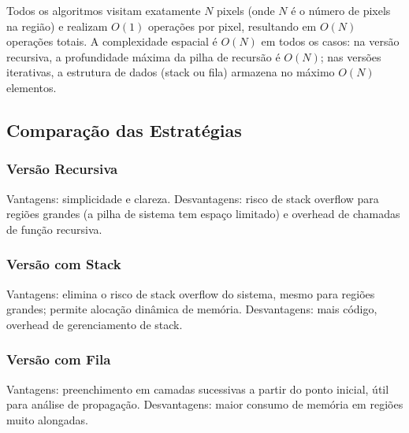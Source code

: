 \documentclass[12pt,a4paper]{article}
\begin{document}
Todos os algoritmos visitam exatamente $N$ pixels (onde $N$ é o número de pixels na região) e realizam $O(1)$ operações por pixel, resultando em $O(N)$ operações totais. A complexidade espacial é $O(N)$ em todos os casos: na versão recursiva, a profundidade máxima da pilha de recursão é $O(N)$; nas versões iterativas, a estrutura de dados (stack ou fila) armazena no máximo $O(N)$ elementos.

\subsection{Comparação das Estratégias}

\subsubsection{Versão Recursiva}

 Vantagens: simplicidade e clareza. Desvantagens: risco de stack overflow para regiões grandes (a pilha de sistema tem espaço limitado) e overhead de chamadas de função recursiva.
\subsubsection{Versão com Stack}

 Vantagens: elimina o risco de stack overflow do sistema, mesmo para regiões grandes; permite alocação dinâmica de memória. Desvantagens: mais código, overhead de gerenciamento de stack. 

\subsubsection{Versão com Fila}

 Vantagens: preenchimento em camadas sucessivas a partir do ponto inicial, útil para análise de propagação. Desvantagens: maior consumo de memória em regiões muito alongadas. 
\end{document}

